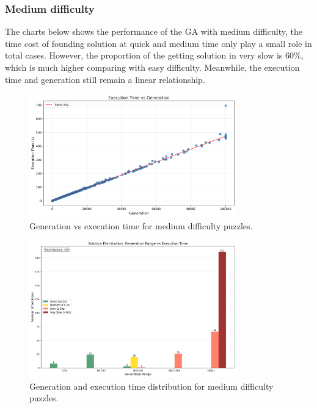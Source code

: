 \subsubsection{Medium difficulty}

The charts below shows the performance of the GA with medium difficulty, the time cost of founding solution at quick and medium time only play a small role in total cases.
However, the proportion of the getting solution in very slow is $60\%$, which is much higher comparing with easy difficulty.
Meanwhile, the execution time and generation still remain a linear relationship.

\begin{figure}[h]
\centering
\includegraphics[width=0.8\textwidth]{resources/generation_vs_execution_time_medium.png}
\caption{Generation vs execution time for medium difficulty puzzles.}
\label{fig:generation_vs_execution_time_medium}
\end{figure}

\begin{figure}[h]
\centering
\includegraphics[width=0.8\textwidth]{resources/generation_execution_time_bars_medium.png}
\caption{Generation and execution time distribution for medium difficulty puzzles.}
\label{fig:generation_execution_time_bars_medium}
\end{figure}

